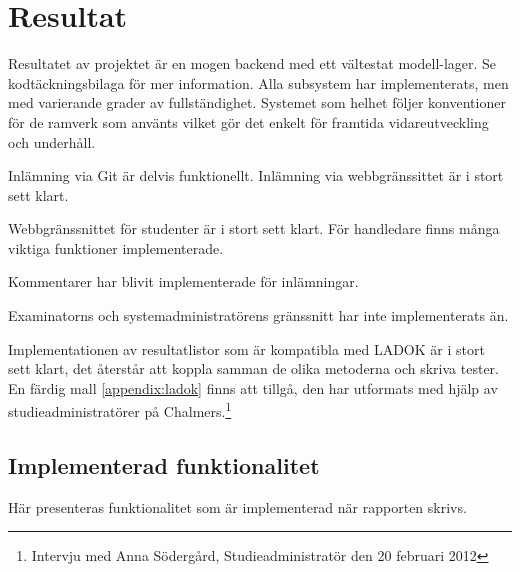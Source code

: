 \section{Resultat}
Resultatet av projektet är en mogen backend med ett vältestat modell-lager. Se kodtäckningsbilaga för mer information. Alla subsystem har implementerats, men med varierande grader av fullständighet. Systemet som helhet följer konventioner för de ramverk som använts vilket gör det enkelt för framtida vidareutveckling och underhåll.

Inlämning via Git är delvis funktionellt. Inlämning via webbgränssittet är i stort sett klart.

Webbgränssnittet för studenter är i stort sett klart. För handledare finns många viktiga funktioner implementerade.

Kommentarer har blivit implementerade för inlämningar.

Examinatorns och systemadministratörens gränssnitt har inte implementerats än.

Implementationen av resultatlistor som är kompatibla med LADOK är i stort sett klart, det återstår att koppla samman de olika metoderna och skriva tester. En färdig mall \ref{appendix:ladok} finns att tillgå, den har utformats med hjälp av studieadministratörer på Chalmers.\footnote{Intervju med Anna Södergård, Studieadministratör den 20 februari 2012}

\subsection{Implementerad funktionalitet}
Här presenteras funktionalitet som är implementerad när rapporten skrivs.
